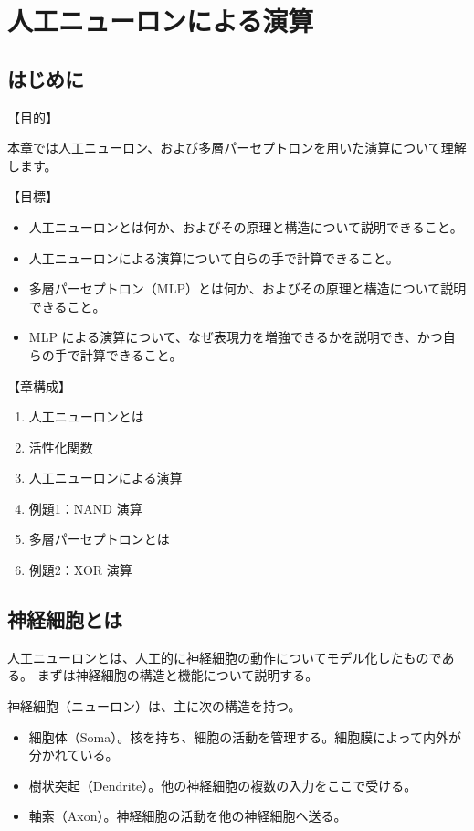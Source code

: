 \chapter{人工ニューロンによる演算}

\section{はじめに}

【目的】

本章では人工ニューロン、および多層パーセプトロンを用いた演算について理解します。

【目標】

\begin{itemize}
    \item 人工ニューロンとは何か、およびその原理と構造について説明できること。
    \item 人工ニューロンによる演算について自らの手で計算できること。
    \item 多層パーセプトロン（MLP）とは何か、およびその原理と構造について説明できること。
    \item MLP による演算について、なぜ表現力を増強できるかを説明でき、かつ自らの手で計算できること。
\end{itemize}

【章構成】

\begin{enumerate}
    \item 人工ニューロンとは
    \item 活性化関数
    \item 人工ニューロンによる演算
    \item 例題1：NAND 演算
    \item 多層パーセプトロンとは
    \item 例題2：XOR 演算
\end{enumerate}

\section{神経細胞とは}


人工ニューロンとは、人工的に神経細胞の動作についてモデル化したものである。
まずは神経細胞の構造と機能について説明する。

神経細胞（ニューロン）は、主に次の構造を持つ。
\begin{itemize}
    \item 細胞体（Soma）。核を持ち、細胞の活動を管理する。細胞膜によって内外が分かれている。
    \item 樹状突起（Dendrite）。他の神経細胞の複数の入力をここで受ける。
    \item 軸索（Axon）。神経細胞の活動を他の神経細胞へ送る。
\end{itemize}

